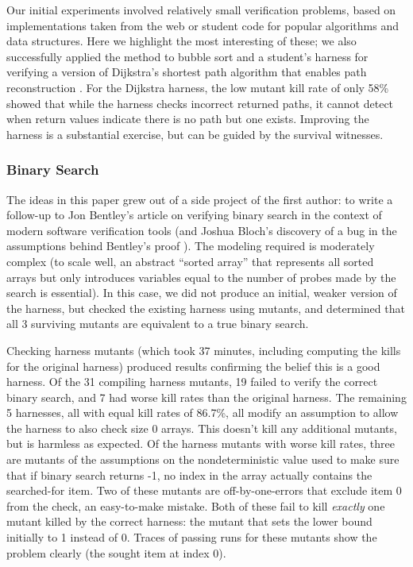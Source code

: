 \documentclass{svjour3}
\begin{document}
Our initial experiments involved relatively small verification
problems, based on implementations taken from the web or student code for popular
algorithms and data structures.  Here we highlight the most
interesting of these; we also successfully applied the method to
bubble sort and a student's harness for verifying a version of Dijkstra's
shortest path algorithm that enables path reconstruction \cite{dijkstrasp}.  For the Dijkstra
harness, the low mutant kill rate of only 58\% showed that while the
harness checks incorrect returned paths, it cannot detect when return
values indicate there is no path but one exists.  Improving the
harness is a substantial exercise, but can be guided by the survival witnesses.

\subsubsection{Binary Search}

The ideas in this paper grew out of a side project of the first
author: to write a follow-up to Jon Bentley's article on verifying
binary search \cite{Bentley} in the context of modern software
verification tools (and Joshua Bloch's discovery of a bug in the
assumptions behind Bentley's proof \cite{Bloch}).  The modeling
required is moderately complex (to scale well, an abstract ``sorted
array'' that represents all sorted arrays but only introduces
variables equal to the number of probes made by the search is
essential).  In this case, we did not produce an initial, weaker
version of the harness, but checked the existing harness using
mutants, and determined that all 3 surviving mutants are equivalent to
a true binary search.

Checking harness mutants (which took 37 minutes, including computing
the kills for the original harness) produced results confirming the belief this is a
good harness.  Of the 31 compiling harness mutants, 19 failed to verify
the correct binary search, and 7 had worse kill rates than the
original harness.  The remaining 5 harnesses, all with equal kill
rates of 86.7\%, all modify an assumption to allow the harness to also
check size 0 arrays.  This doesn't kill any additional mutants, but is
harmless as expected.  Of the harness mutants with worse kill rates,
three are mutants of the assumptions on the nondeterministic value used to
make sure that if binary search returns -1, no index in the array
actually contains the searched-for item.  Two of these mutants are
off-by-one-errors that exclude item 0 from the check, an easy-to-make
mistake.  Both of these fail to kill \emph{exactly} one mutant killed by the
correct harness: the mutant that sets the lower bound
initially to 1 instead of 0.  Traces of passing runs for these mutants show the
problem clearly (the sought item at index 0).
\end{document}
